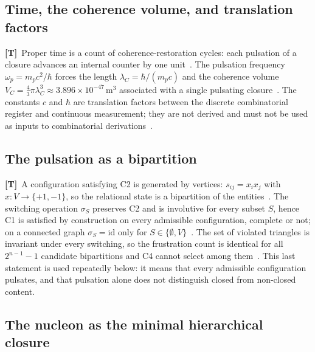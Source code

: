 \documentclass[11pt,a4paper]{article}
\theoremstyle{plain}
\theoremstyle{definition}
\theoremstyle{remark}
\newcommand{\statT}{\textbf{[T]}}
\begin{document}
\subsection{Time, the coherence volume, and translation factors}

\statT\ Proper time is a count of coherence-restoration cycles: each pulsation of a closure advances an internal counter by one unit~\citep{D10a,D67}. The pulsation frequency $\omega_p=m_pc^2/\hbar$ forces the length $\lambda_C=\hbar/(m_pc)$ and the coherence volume $V_C=\tfrac{4}{3}\pi\lambda_C^3\approx3.896\times10^{-47}\,\mathrm{m}^3$ associated with a single pulsating closure~\citep{D48,D67}. The constants $c$ and $\hbar$ are translation factors between the discrete combinatorial register and continuous measurement; they are not derived and must not be used as inputs to combinatorial derivations~\citep{D67}.

\subsection{The pulsation as a bipartition}

\statT\ A configuration satisfying C2 is generated by vertices: $s_{ij}=x_ix_j$ with $x:V\to\{+1,-1\}$, so the relational state is a bipartition of the entities~\citep{D68}. The switching operation $\sigma_S$ preserves C2 and is involutive for every subset $S$, hence C1 is satisfied by construction on every admissible configuration, complete or not; on a connected graph $\sigma_S=\mathrm{id}$ only for $S\in\{\emptyset,V\}$~\citep{D68}. The set of violated triangles is invariant under every switching, so the frustration count is identical for all $2^{n-1}-1$ candidate bipartitions and C4 cannot select among them~\citep{D68}. This last statement is used repeatedly below: it means that every admissible configuration pulsates, and that pulsation alone does not distinguish closed from non-closed content.

\subsection{The nucleon as the minimal hierarchical closure}
\end{document}

